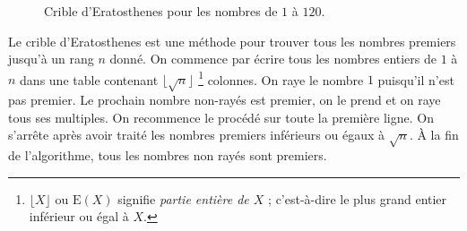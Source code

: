 \begin{figure}[h!]
                  \caption{Crible d'Eratosthenes pour les nombres de $1$ \`a $120$.
                              }
                  \label{fig: Eratosthenes}
                  \end{figure}
            Le crible d'Eratosthenes est une m\'ethode pour trouver tous les nombres premiers jusqu'\`a un rang $n$ donn\'e.
            On commence par \'ecrire tous les nombres entiers de $1$ \`a $n$ dans une table 
            contenant $\lfloor \sqrt{n} \rfloor$%
            \footnote{ $\lfloor X \rfloor$ ou $\mathrm{E}\left( X \right)$ signifie 
                       \emph{partie enti\`ere de $X$} ;
                       c'est-\`a-dire le plus grand entier inf\'erieur ou \'egal \`a $X$.
                     }
            colonnes.
            On raye le nombre $1$ puisqu'il n'est pas premier.
            Le prochain nombre non-ray\'es est premier, on le prend et on raye tous ses multiples.
            On recommence le proc\'ed\'e sur toute la premi\`ere ligne.
            On s'arr\^ete apr\`es avoir trait\'e les nombres premiers inf\'erieurs ou \'egaux \`a $\sqrt{n}$.
            \`A la fin de l'algorithme, tous les nombres non ray\'es sont premiers.
%                  
